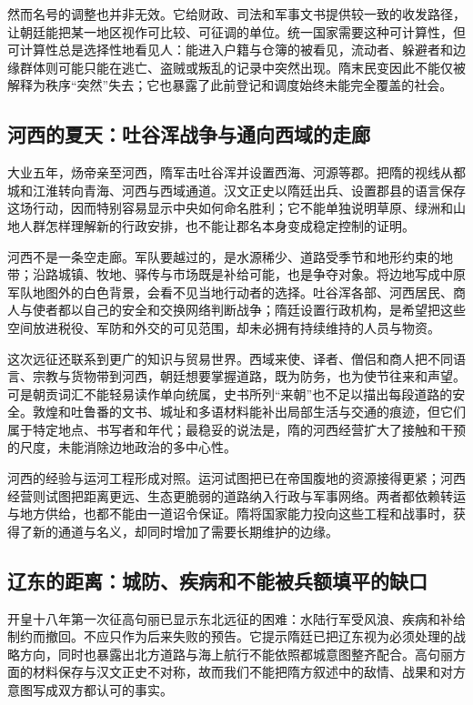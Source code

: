 然而名号的调整也并非无效。它给财政、司法和军事文书提供较一致的收发路径，让朝廷能把某一地区视作可比较、可征调的单位。统一国家需要这种可计算性，但可计算性总是选择性地看见人：能进入户籍与仓簿的被看见，流动者、躲避者和边缘群体则可能只能在逃亡、盗贼或叛乱的记录中突然出现。隋末民变因此不能仅被解释为秩序“突然”失去；它也暴露了此前登记和调度始终未能完全覆盖的社会。

\subsection{河西的夏天：吐谷浑战争与通向西域的走廊}
大业五年，炀帝亲至河西，隋军击吐谷浑并设置西海、河源等郡。把隋的视线从都城和江淮转向青海、河西与西域通道。汉文正史以隋廷出兵、设置郡县的语言保存这场行动，因而特别容易显示中央如何命名胜利；它不能单独说明草原、绿洲和山地人群怎样理解新的行政安排，也不能让郡名本身变成稳定控制的证明。

河西不是一条空走廊。军队要越过的，是水源稀少、道路受季节和地形约束的地带；沿路城镇、牧地、驿传与市场既是补给可能，也是争夺对象。将边地写成中原军队地图外的白色背景，会看不见当地行动者的选择。吐谷浑各部、河西居民、商人与使者都以自己的安全和交换网络判断战争；隋廷设置行政机构，是希望把这些空间放进税役、军防和外交的可见范围，却未必拥有持续维持的人员与物资。

这次远征还联系到更广的知识与贸易世界。西域来使、译者、僧侣和商人把不同语言、宗教与货物带到河西，朝廷想要掌握道路，既为防务，也为使节往来和声望。可是朝贡词汇不能轻易读作单向统属，史书所列“来朝”也不足以描出每段道路的安全。敦煌和吐鲁番的文书、城址和多语材料能补出局部生活与交通的痕迹，但它们属于特定地点、书写者和年代；最稳妥的说法是，隋的河西经营扩大了接触和干预的尺度，未能消除边地政治的多中心性。

河西的经验与运河工程形成对照。运河试图把已在帝国腹地的资源接得更紧；河西经营则试图把距离更远、生态更脆弱的道路纳入行政与军事网络。两者都依赖转运与地方供给，也都不能由一道诏令保证。隋将国家能力投向这些工程和战事时，获得了新的通道与名义，却同时增加了需要长期维护的边缘。

\subsection{辽东的距离：城防、疾病和不能被兵额填平的缺口}
开皇十八年第一次征高句丽已显示东北远征的困难：水陆行军受风浪、疾病和补给制约而撤回。不应只作为后来失败的预告。它提示隋廷已把辽东视为必须处理的战略方向，同时也暴露出北方道路与海上航行不能依照都城意图整齐配合。高句丽方面的材料保存与汉文正史不对称，故而我们不能把隋方叙述中的敌情、战果和对方意图写成双方都认可的事实。

